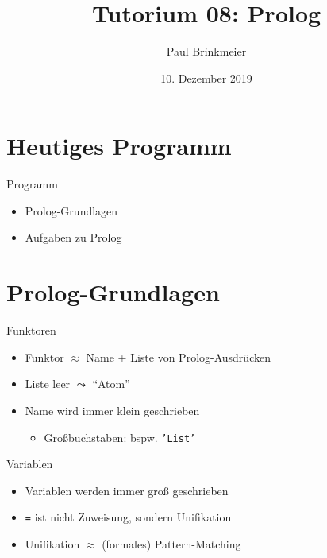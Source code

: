 \documentclass{beamer}
\title{Tutorium 08: Prolog}
\author{Paul Brinkmeier}
\institute{Tutorium Programmierparadigmen am KIT}
\date{10. Dezember 2019}
\newcommand{\code}[1]{
	\begin{mdframed}
		
	\end{mdframed}
}
\begin{document}
\begin{frame}
	\titlepage
\end{frame}

\section{Heutiges Programm}

\begin{frame}{Programm}
	\begin{itemize}
		\item Prolog-Grundlagen
		\item Aufgaben zu Prolog
	\end{itemize}
\end{frame}

\section{Prolog-Grundlagen}

\begin{frame}{Funktoren}
	\code{demos/funktoren.pl}

	\begin{itemize}
		\item Funktor $\approx$ Name + Liste von Prolog-Ausdrücken
		\item Liste leer $\leadsto$ \enquote{Atom}
		\item Name wird immer klein geschrieben
		\begin{itemize}
			\item Großbuchstaben: bspw. \texttt{'List'}
		\end{itemize}
	\end{itemize}
\end{frame}

\begin{frame}{Variablen}
	\code{demos/variablen.pl}

	\begin{itemize}
		\item Variablen werden immer groß geschrieben
		\item \texttt{=} ist nicht Zuweisung, sondern Unifikation
		\item Unifikation $\approx$ (formales) Pattern-Matching
	\end{itemize}
\end{frame}
\end{document}
